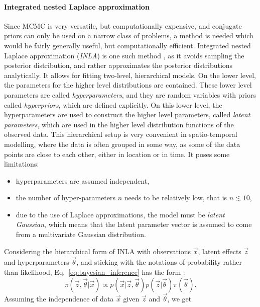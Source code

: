\paragraph{Integrated nested Laplace approximation}
Since MCMC is very versatile, but computationally expensive, and conjugate priors can only be used on a narrow class of problems, a method is needed which would be fairly generally useful, but computationally efficient. Integrated nested Laplace approximation (\textit{INLA}) is one such method \citep{rue2009approximate,martins2013bayesian}, as it avoids sampling the posterior distribution, and rather approximates the posterior distributions analytically. It allows for fitting two-level, hierarchical models. On the lower level, the parameters for the higher level distributions are contained. These lower level parameters are called \textit{hyperparameters}, and they are random variables with priors called \textit{hyperpriors}, which are defined explicitly. On this lower level, the hyperparameters are used to construct the higher level parameters, called \textit{latent parameters}, which are used in the higher level distribution functions of the observed data. This hierarchical setup is very convenient in spatio-temporal modelling, where the data is often grouped in some way, as some of the data points are close to each other, either in location or in time. It poses some limitations:
\begin{itemize}
    \item hyperparameters are assumed independent,
    \item the number of hyper-parameters $n$ needs to be relatively low, that is $n \lesssim 10$,
    \item due to the use of Laplace approximations, the model must be \textit{latent Gaussian}, which means that the latent parameter vector is assumed to come from a multivariate Gaussian distribution.
\end{itemize}
Considering the hierarchical form of INLA with observations $\vec{x}$, latent effects $\vec{z}$ and hyperparameters $\vec{\theta}$, and sticking with the notations of probability rather than likelihood, Eq.~\ref{eq:bayesian_inference} has the form \citep{gomez2020bayesian}:
\begin{equation}
    \pi(\vec{z}, \vec{\theta}|\vec{x}) \propto p(\vec{x}|\vec{z}, \vec{\theta}) p(\vec{z}|\vec{\theta}) \pi(\vec{\theta}).
    \label{eq:bayesian_hierarchical}
\end{equation}
Assuming the independence of data $\vec{x}$ given $\vec{z}$ and $\vec{\theta}$, we get

